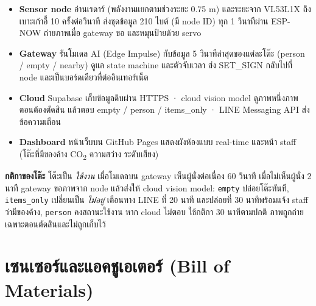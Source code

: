 \documentclass[a4paper,11pt]{article}
\begin{document}
\begin{itemize}
\item \textbf{Sensor node} อ่านเรดาร์ (พลังงานแยกตามช่วงระยะ 0.75 m) และระยะจาก VL53L1X ถึงเบาะเก้าอี้ 10 ครั้งต่อวินาที
  ส่งชุดข้อมูล 210 ไบต์ (มี node ID) ทุก 1 วินาทีผ่าน ESP-NOW ถ่ายภาพเมื่อ gateway ขอ และหมุนป้ายด้วย servo
\item \textbf{Gateway} รันโมเดล AI (Edge Impulse) กับข้อมูล 5 วินาทีล่าสุดของแต่ละโต๊ะ (person / empty / nearby)
  ดูแล state machine และตัวจับเวลา ส่ง SET\_SIGN กลับไปที่ node และเป็นบอร์ดเดียวที่ต่ออินเทอร์เน็ต
\item \textbf{Cloud} Supabase เก็บข้อมูลดิบผ่าน HTTPS · cloud vision model ดูภาพหนึ่งภาพตอนต้องตัดสิน
  แล้วตอบ empty / person / items\_only · LINE Messaging API ส่งข้อความเตือน
\item \textbf{Dashboard} หน้าเว็บบน GitHub Pages แสดงผังห้องแบบ real-time และหน้า staff
  (โต๊ะที่มีของค้าง CO\textsubscript{2} ความสว่าง ระดับเสียง)
\end{itemize}

\textbf{กติกาของโต๊ะ} โต๊ะเป็น \emph{ใช้งาน} เมื่อโมเดลบน gateway เห็นผู้นั่งต่อเนื่อง 60 วินาที เมื่อไม่เห็นผู้นั่ง 2 นาที gateway ขอภาพจาก node
แล้วส่งให้ cloud vision model: \texttt{empty} ปล่อยโต๊ะทันที, \texttt{items\_only} เปลี่ยนเป็น \emph{ไม่อยู่} เตือนทาง LINE ที่ 20 นาที
และปล่อยที่ 30 นาทีพร้อมแจ้ง staff ว่ามีของค้าง, \texttt{person} คงสถานะใช้งาน หาก cloud ไม่ตอบ ใช้กติกา 30 นาทีตามปกติ
ภาพถูกถ่ายเฉพาะตอนตัดสินและไม่ถูกเก็บไว้

\section{เซนเซอร์และแอคชูเอเตอร์ (Bill of Materials)}
\end{document}
